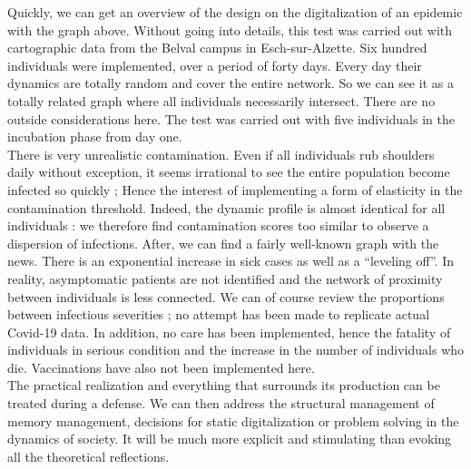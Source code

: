 Quickly, we can get an overview of the design on the digitalization of an epidemic with the graph above. Without going into details, this test was carried out with cartographic data from the Belval campus in Esch-sur-Alzette. Six hundred individuals were implemented, over a period of forty days. Every day their dynamics are totally random and cover the entire network. So we can see it as a totally related graph where all individuals necessarily intersect. There are no outside considerations here. The test was carried out with five individuals in the incubation phase from day one.\\

There is very unrealistic contamination. Even if all individuals rub shoulders daily without exception, it seems irrational to see the entire population become infected so quickly ; Hence the interest of implementing a form of elasticity in the contamination threshold. Indeed, the dynamic profile is almost identical for all individuals : we therefore find contamination scores too similar to observe a dispersion of infections. After, we can find a fairly well-known graph with the news. There is an exponential increase in sick cases as well as a ``leveling off''. In reality, asymptomatic patients are not identified and the network of proximity between individuals is less connected. We can of course review the proportions between infectious severities ; no attempt has been made to replicate actual Covid-19 data. In addition, no care has been implemented, hence the fatality of individuals in serious condition and the increase in the number of individuals who die. Vaccinations have also not been implemented here.\\

The practical realization and everything that surrounds its production can be treated during a defense. We can then address the structural management of memory management, decisions for static digitalization or problem solving in the dynamics of society. It will be much more explicit and stimulating than evoking all the theoretical reflections.